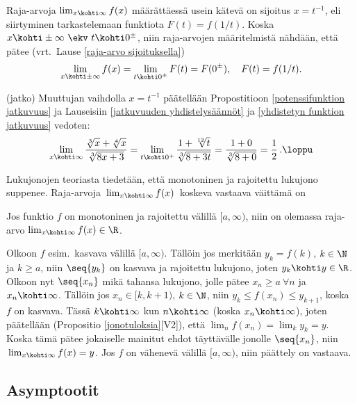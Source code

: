 Raja-arvoja $\lim_{x\kohti\infty} f(x)$ määrättäessä usein kätevä on sijoitus $x=t^{-1}$, eli
siirtyminen tarkastelemaan funktiota $F(t)=f(1/t)$. Koska 
$x\kohti\pm\infty\ \ekv\ t\kohti 0^\pm$, niin raja-arvojen määritelmistä nähdään, että pätee
(vrt.\ Lause \ref{raja-arvo sijoituksella})
\[
\lim_{x\kohti\pm\infty} f(x) = \lim_{t\kohti 0^\pm} F(t) = F(0^\pm), \quad F(t)=f(1/t).
\]
\begin{Exa} (jatko) Muuttujan vaihdolla $x=t^{-1}$ päätellään Propostitioon 
\ref{potenssifunktion jatkuvuus} ja Lauseisiin \ref{jatkuvuuden yhdistelysäännöt} ja 
\ref{yhdistetyn funktion jatkuvuus} vedoten:
\[
\lim_{x\kohti\infty} \frac{\sqrt[3]{x}+\sqrt[4]{x}}{\sqrt[3]{8x+3}} 
                 = \lim_{t\kohti 0^+} \frac{1+\sqrt[12]{t}}{\sqrt[3]{8+3t}}
                 = \frac{1+0}{\sqrt[3]{8+0}} = \frac{1}{2}\,. \loppu
\]
\end{Exa}
Lukujonojen teoriasta tiedetään, että monotoninen ja rajoitettu lukujono suppenee.
Raja-arvoja $\,\lim_{x\kohti\infty}f(x)\,$ koskeva vastaava väittämä on
\begin{Lause} \label{monotonisen funktion raja-arvo} Jos funktio $f$ on monotoninen ja
rajoitettu välillä $[a,\infty)$, niin on olemassa raja-arvo $\lim_{x\kohti\infty}f(x)\in\R$.
\end{Lause}
\tod Olkoon $f$ esim.\ kasvava välillä $[a,\infty)$. Tällöin jos merkitään $y_k=f(k)$,
$k\in\N$ ja $k \ge a$, niin $\seq{y_k}$ on kasvava ja rajoitettu lukujono, joten
$y_k \kohti y\in\R$. Olkoon nyt $\seq{x_n}$ mikä tahansa lukujono, jolle pätee
$x_n\ge a\ \forall n$ ja $x_n\kohti\infty$. Tällöin jos $x_n\in[k,k+1)$, $k\in\N$, niin
$y_k \le f(x_n) \le y_{k+1}$, koska $f$ on kasvava. Tässä $k\kohti\infty$ kun $n\kohti\infty$
(koska $x_n\kohti\infty$), joten päätellään (Propositio \ref{jonotuloksia}[V2]), että
$\lim_nf(x_n)=\lim_ky_k=y$. Koska tämä pätee jokaiselle mainitut ehdot täyttävälle jonolle
$\seq{x_n}$, niin $\,\lim_{x\kohti\infty}f(x)=y$. Jos $f$ on vähenevä välillä $[a,\infty)$, niin
päättely on vastaava. \loppu

\subsection{Asymptootit}

